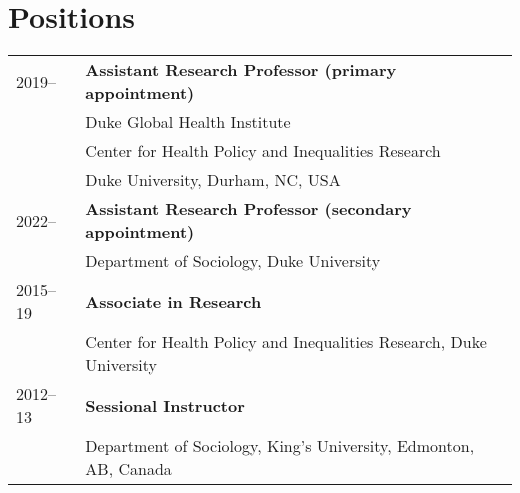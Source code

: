 \vspace{2ex}
\section*{Positions}
\begin{longtable}{p{} p{}}
2019-- & \textbf{Assistant Research Professor (primary appointment)}\\
		             & Duke Global Health Institute\\
		             & Center for Health Policy and Inequalities Research\\
		             &Duke University, Durham, NC, USA \\
		             
		             2022-- & \textbf{Assistant Research Professor (secondary appointment)}\\
		             & Department of Sociology, Duke University \\
		             
2015--19 & \textbf{Associate in Research}\\
& Center for Health Policy and Inequalities Research, Duke University\\

2012--13 & \textbf{Sessional Instructor}\\
& Department of Sociology, King's University, Edmonton, AB, Canada\\
\end{longtable}
